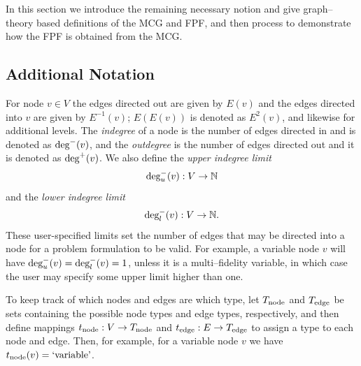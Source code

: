 In this section we introduce the remaining necessary notion and give graph--theory based definitions of the MCG and FPF, and then process to demonstrate how the FPF is obtained from the MCG.

\subsection{Additional Notation}
For node $v \in V$ the edges directed out are given by $E(v)$ and the edges directed into $v$ are given by $E^{-1}(v)$; $E(E(v))$ is denoted as $E^2(v)$, and likewise for additional levels. 
The \emph{indegree} of a node is the number of edges directed in and is denoted as $\textrm{deg}^-(v)$, and the \emph{outdegree} is the number of edges directed out and it is denoted as $\textrm{deg}^+(v)$.
We also define the \emph{upper indegree limit} 
\begin{equation}
\textrm{deg}_u^-(v):V \to \mathbb{N}
\end{equation} 
and the \emph{lower indegree limit}
\begin{equation}
\textrm{deg}_l^-(v):V \to \mathbb{N}.
\end{equation}
These user-specified limits set the number of edges that may be directed into a node for a problem formulation to be valid. For example, a variable node $v$ will have $\textrm{deg}_u^-(v) = \textrm{deg}_l^-(v) = 1$, unless it is a multi--fidelity variable, in which case the user may specify some upper limit higher than one.

To keep track of which nodes and edges are which type, let $T_\textrm{node}$ and $T_\textrm{edge}$ be sets containing the possible node types and edge types, respectively, and then define mappings $t_\textrm{node}:V \to T_\textrm{node}$ and $t_\textrm{edge}:E \to T_\textrm{edge}$ to assign a type to each node and edge.
Then, for example, for a variable node $v$ we have $t_\textrm{node}(v) = \textrm{`variable'}$.




